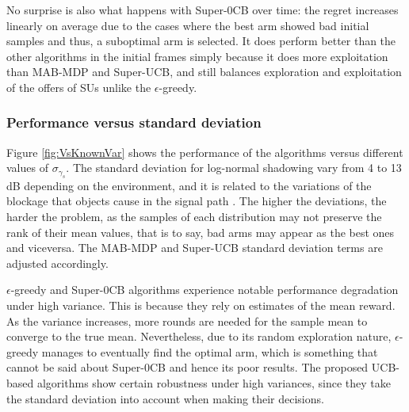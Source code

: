 No surprise is also what happens with Super-0CB over time: the regret increases linearly on average due to the cases where the best arm showed bad initial samples and thus, a suboptimal arm is selected. 
It does perform better than the other algorithms in the initial frames simply because it does more exploitation than MAB-MDP and Super-UCB, and still balances exploration and exploitation of the offers of SUs unlike the $\epsilon$-greedy.

\subsubsection{Performance versus standard deviation}

Figure \ref{fig:VsKnownVar} shows the performance of the algorithms versus different values of $\sigma_{\gamma_s}$. The standard deviation for log-normal shadowing vary from 4 to 13 dB depending on the environment, and it is related to the variations of the blockage that objects cause in the signal path \cite{ref:Goldsmith2005}. The higher the deviations, the harder the problem, as the samples of each distribution may not preserve the rank of their mean values, that is to say, bad arms may appear as the best ones and viceversa. The MAB-MDP and Super-UCB standard deviation terms are adjusted accordingly. 

$\epsilon$-greedy and Super-0CB algorithms experience notable performance degradation under high variance. This is because they rely on estimates of the mean reward. As the variance increases, more rounds are needed for the sample mean to converge to the true mean. Nevertheless, due to its random exploration nature, $\epsilon$-greedy manages to eventually find the optimal arm, which is something that cannot be said about Super-0CB and hence its poor results. 
The proposed UCB-based algorithms show certain robustness under high variances, since they take the standard deviation into account when making their decisions. 
 
